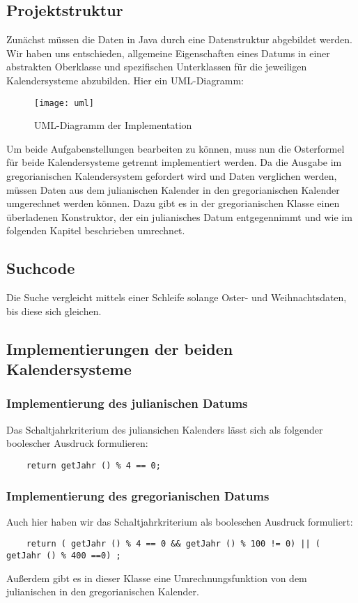 \subsection{Projektstruktur}
Zunächst müssen die Daten in Java durch eine Datenstruktur abgebildet werden. Wir haben uns entschieden, allgemeine Eigenschaften eines Datums in einer abstrakten Oberklasse und spezifischen Unterklassen für die jeweiligen Kalendersysteme abzubilden. Hier ein UML-Diagramm:
\begin{figure}[h]
	\centering
	\texttt{[image: uml]}
	\caption{UML-Diagramm der Implementation}
\end{figure}

Um beide Aufgabenstellungen bearbeiten zu können, muss nun die Osterformel für beide Kalendersysteme getrennt  implementiert werden. Da die Ausgabe im gregorianischen Kalendersystem gefordert wird und Daten verglichen werden, müssen Daten aus dem julianischen Kalender in den gregorianischen Kalender umgerechnet werden können. Dazu gibt es in der gregorianischen Klasse einen überladenen Konstruktor, der ein julianisches Datum entgegennimmt und wie im folgenden Kapitel beschrieben umrechnet.

\subsection{Suchcode}
Die Suche vergleicht mittels einer Schleife solange Oster- und Weihnachtsdaten, bis diese sich gleichen.
\clearpage
\subsection{Implementierungen der beiden Kalendersysteme}
	\subsubsection{Implementierung des julianischen Datums}
	Das Schaltjahrkriterium des juliansichen Kalenders lässt sich als folgender boolescher Ausdruck formulieren:
	\begin{lstlisting}
	return getJahr () % 4 == 0;
	\end{lstlisting}
	\subsubsection{Implementierung des gregorianischen Datums}
	Auch hier haben wir das Schaltjahrkriterium als booleschen Ausdruck formuliert:
	\begin{lstlisting}
	return ( getJahr () % 4 == 0 && getJahr () % 100 != 0) || ( getJahr () % 400 ==0) ;
	\end{lstlisting}
	Außerdem gibt es in dieser Klasse eine Umrechnungsfunktion von dem julianischen in den gregorianischen Kalender. 


